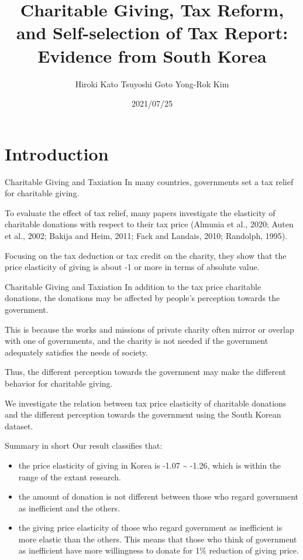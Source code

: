 \documentclass[
  ignorenonframetext,
  aspectratio=169,
]{beamer}
\title{Charitable Giving, Tax Reform, and Self-selection of Tax Report: Evidence from South Korea}
\author[shortname]{ Hiroki Kato  Tsuyoshi Goto  Yong-Rok Kim }
\institute[shortinst]{ \inst{} Osaka University \and  \inst{} Chiba University \and  \inst{} Kobe University \and }
\date{2021/07/25}
\providecommand{\tightlist}{%
  \setlength{\itemsep}{0pt}\setlength{\parskip}{0pt}}
\begin{document}
\frame{\titlepage}

\hypertarget{introduction}{%
\section{Introduction}\label{introduction}}

\begin{frame}{Charitable Giving and Taxiation}
\protect\hypertarget{charitable-giving-and-taxiation}{}
In many countries, governments set a tax relief for charitable giving.

To evaluate the effect of tax relief, many papers investigate the elasticity of charitable donations with respect to their tax price (Almunia et al., 2020; Auten et al., 2002; Bakija and Heim, 2011; Fack and Landais, 2010; Randolph, 1995).

Focusing on the tax deduction or tax credit on the charity, they show that the price elasticity of giving is about -1 or more in terms of absolute value.
\end{frame}

\begin{frame}{Charitable Giving and Taxiation}
\protect\hypertarget{charitable-giving-and-taxiation-1}{}
In addition to the tax price charitable donations, the donations may be affected by people's perception towards the government.

This is because the works and missions of private charity often mirror or overlap with one of governments, and the charity is not needed if the government adequately satisfies the needs of society.

Thus, the different perception towards the government may make the different behavior for charitable giving.

We investigate the relation between tax price elasticity of charitable donations and the different perception towards the government using the South Korean dataset.
\end{frame}

\begin{frame}{Summary in short}
\protect\hypertarget{summary-in-short}{}
Our result classifies that:

\begin{itemize}
\tightlist
\item
  the price elasticity of giving in Korea is -1.07 \textasciitilde{} -1.26, which is within the range of the extant research.
\item
  the amount of donation is not different between those who regard government as inefficient and the others.
\item
  the giving price elasticity of those who regard government as inefficient is more elastic than the others. This means that those who think of government as inefficient have more willingness to donate for 1\% reduction of giving price.
\end{itemize}
\end{frame}
\end{document}
